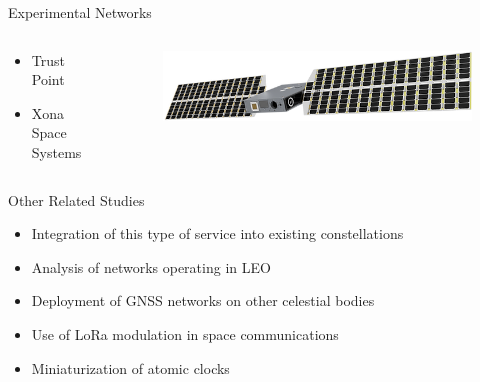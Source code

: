 \begin{frame}{Experimental Networks}

    \begin{columns}[t]
        \begin{column}[t]{0.4\textwidth}
            \begin{itemize}
                \item Trust Point
                \vspace{0.3cm}
                \item Xona Space Systems
            \end{itemize}
        \end{column}
        \begin{column}[t]{0.6\textwidth}
            \begin{figure}[!ht]
                \begin{center}
                    \includegraphics[width=0.9\columnwidth]{figures/xona-satellite}
                \end{center}
            \end{figure}
        \end{column}
    \end{columns}

\end{frame}

\begin{frame}{Other Related Studies}

    \begin{itemize}
        \item Integration of this type of service into existing constellations
        \vspace{0.3cm}
        \item Analysis of networks operating in LEO
        \vspace{0.3cm}
        \item Deployment of GNSS networks on other celestial bodies
        \vspace{0.3cm}
        \item Use of LoRa modulation in space communications
        \vspace{0.3cm}
        \item Miniaturization of atomic clocks
    \end{itemize}

\end{frame}

